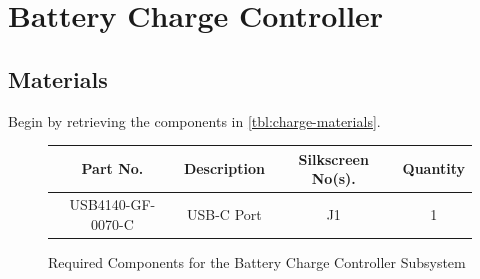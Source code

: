 \documentclass{article}
\newcommand{\resistor}[1]{$\text{#1} \Omega \text{ Resistor}$}
\begin{document}





\section{Battery Charge Controller}

\subsection{Materials}
Begin by retrieving the components in \autoref{tbl:charge-materials}.

\begin{figure}[H]
    \begin{center}
        \begin{tabular}{ c|c|c|c } 
            \textbf{Part No.} & \textbf{Description} & \textbf{Silkscreen No(s).} & \textbf{Quantity} \\ 
            \hline
            USB4140-GF-0070-C & USB-C Port & J1 & 1 \\ 
        \end{tabular}
    \end{center}
    \caption{Required Components for the Battery Charge Controller Subsystem}
    \label{tbl:charge-materials}
\end{figure}
\end{document}
